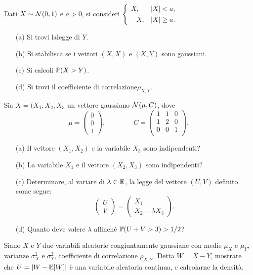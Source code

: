 \Esercizio{} %
Dati $X\sim\mathcal{N}(0,1)$ e $a>0$, si consideri $\begin{cases}X,&|X|<a,\\-X,&|X|\geq a.  \end{cases}$
\begin{enumerate}
\item [(a)] Si trovi lalegge di $Y$.
\item [(b)] Si stabilisca se i vettori $(X,X)$ e $(X,Y)$ sono gaussiani.
\item [(c)] Si calcoli $\mathbb{P}(X>Y)$.
\item [(d)] Si trovi il coefficiente di correlazione$\rho_{X,Y}$.
\end{enumerate}

\Esercizio{} %
Sia $X=(X_1,X_2,X_3$ un vettore gaussiano $\mathcal{N}(\mu,C)$, dove
\[
\mu=\begin{pmatrix}
0 \\0
 \\1
\end{pmatrix},\qquad\qquad C=\begin{pmatrix}
1 & 1 & 0 \\
1 & 2 & 0 \\
0 &  0& 1 \\
\end{pmatrix}.
\]
\begin{enumerate}
\item [(a)] Il vettore $(X_1,X_2)$ e la variabile $X_3$ sono indipendenti?
\item [(b)] La variabile $X_1$ e il vettore $(X_2,X_3)$ sono indipendenti?
\item [(c)] Determinare, al variare di $\lambda\in\mathbb{R}$, la legge del vettore $(U,V)$ definito come segue:
\[
\begin{pmatrix}
U \\V

\end{pmatrix}=\begin{pmatrix}
X_1 \\X_2+\lambda X_3
\end{pmatrix}.
\]
\item [(d)] Quanto deve valere $\lambda$ affinché $\mathbb{P}(U+V>3)>1/2$?
\end{enumerate}

\Esercizio{} %
Siano $X$ e $Y$ due variabili aleatorie congiuntamente gaussiane con medie $\mu_X$ e $\mu_Y$, varianze $\sigma_X^2$ e $\sigma_Y^2$, coefficiente di correlazione $\rho_{X,Y}$. Detta $W=X-Y$, mostrare che $U=|W-\mathbb{E}[W]|$ è una variabile aleatoria continua, e calcolarne la densità.

